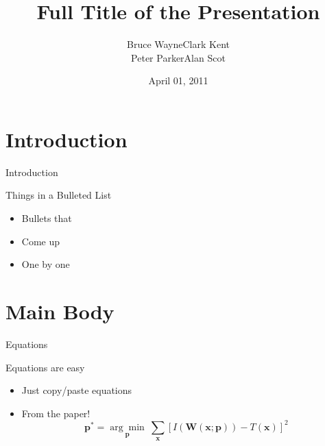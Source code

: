 \documentclass[utf8, a4paper]{beamer}
\title
  [Short Title\hspace{2em}]
  {Full Title of the Presentation}
\author
  [Bruce Wayne]
  {Bruce Wayne\quad Clark Kent\\Peter Parker\quad Alan Scot}
\date
  {April 01, 2011}
\institute
  {Justice League of America}
\begin{document}
\maketitle
{}


\section
  {Introduction}

\begin{frame}
  {Introduction}

  Things in a Bulleted List\pause

  \begin{itemize}
  \item Bullets that\pause
  \item Come up\pause
  \item One by one
  \end{itemize}
\end{frame}


\section
  {Main Body}

\begin{frame}
  {Equations}

  Equations are easy
  \begin{itemize}
  \item Just copy/paste equations\pause
  \item From the paper!
    \begin{equation*}
      \textbf{p}^* = \underset{\textbf{p}}{\arg\!\min}~\sum_{\textbf{x}}\left[ I(\textbf{W}(\textbf{x};\textbf{p})) - T(\textbf{x}) \right]^2
    \end{equation*}
  \end{itemize}
\end{frame}
\end{document}
